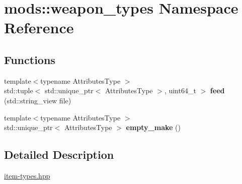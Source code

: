 \hypertarget{namespacemods_1_1weapon__types}{}\section{mods\+:\+:weapon\+\_\+types Namespace Reference}
\label{namespacemods_1_1weapon__types}
\subsection*{Functions}
\begin{DoxyCompactItemize}
\item 
\mbox{\label{namespacemods_1_1weapon__types_ad35c35bc22e57b83d2d697a610a63a14}} 
{\footnotesize template$<$typename Attributes\+Type $>$ }\\std\+::tuple$<$ std\+::unique\+\_\+ptr$<$ Attributes\+Type $>$, uint64\+\_\+t $>$ {\bfseries feed} (std\+::string\+\_\+view file)
\item 
\mbox{\label{namespacemods_1_1weapon__types_a599e946a572c8e1d7b1262e7ac86c716}} 
{\footnotesize template$<$typename Attributes\+Type $>$ }\\std\+::unique\+\_\+ptr$<$ Attributes\+Type $>$ {\bfseries empty\+\_\+make} ()
\end{DoxyCompactItemize}


\subsection{Detailed Description}
\hyperlink{item-types_8hpp_source}{item-\/types.\+hpp} 